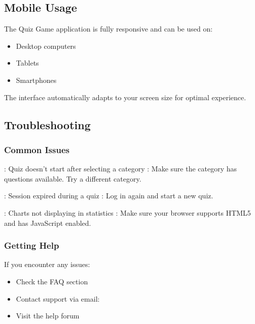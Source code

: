 \documentclass[letterpaper,10pt,english]{sphinxmanual}
\begin{document}
\subsection{Mobile Usage}
\label{\detokenize{user_guide:mobile-usage}}
\sphinxAtStartPar
The Quiz Game application is fully responsive and can be used on:
\begin{itemize}
\item {} 
\sphinxAtStartPar
Desktop computers

\item {} 
\sphinxAtStartPar
Tablets

\item {} 
\sphinxAtStartPar
Smartphones

\end{itemize}

\sphinxAtStartPar
The interface automatically adapts to your screen size for optimal experience.


\subsection{Troubleshooting}
\label{\detokenize{user_guide:troubleshooting}}

\subsubsection{Common Issues}
\label{\detokenize{user_guide:common-issues}}
\sphinxAtStartPar
{}: Quiz doesn’t start after selecting a category
: Make sure the category has questions available. Try a different category.

\sphinxAtStartPar
{}: Session expired during a quiz
: Log in again and start a new quiz.

\sphinxAtStartPar
{}: Charts not displaying in statistics
: Make sure your browser supports HTML5 and has JavaScript enabled.


\subsubsection{Getting Help}
\label{\detokenize{user_guide:getting-help}}
\sphinxAtStartPar
If you encounter any issues:
\begin{itemize}
\item {} 
\sphinxAtStartPar
Check the FAQ section

\item {} 
\sphinxAtStartPar
Contact support via email: 

\item {} 
\sphinxAtStartPar
Visit the help forum

\end{itemize}
\end{document}
